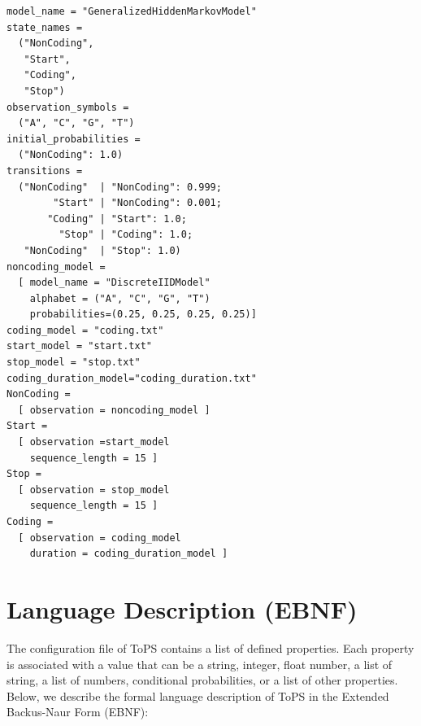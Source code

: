 \begin{Verbatim}[frame=single,  label={ghmm.txt}]
model_name = "GeneralizedHiddenMarkovModel"
state_names =
  ("NonCoding",
   "Start",
   "Coding",
   "Stop")
observation_symbols =
  ("A", "C", "G", "T")
initial_probabilities =
  ("NonCoding": 1.0)
transitions =
  ("NonCoding"  | "NonCoding": 0.999;
        "Start" | "NonCoding": 0.001;
       "Coding" | "Start": 1.0;
         "Stop" | "Coding": 1.0;
   "NonCoding"  | "Stop": 1.0)
noncoding_model =
  [ model_name = "DiscreteIIDModel"
    alphabet = ("A", "C", "G", "T")
    probabilities=(0.25, 0.25, 0.25, 0.25)]
coding_model = "coding.txt"
start_model = "start.txt"
stop_model = "stop.txt"
coding_duration_model="coding_duration.txt"
NonCoding =
  [ observation = noncoding_model ]
Start =
  [ observation =start_model
    sequence_length = 15 ]
Stop =
  [ observation = stop_model
    sequence_length = 15 ]
Coding =
  [ observation = coding_model
    duration = coding_duration_model ]
\end{Verbatim}


\section{Language Description (EBNF)}

The configuration file of ToPS contains a list of defined properties. Each property is associated with a value that can be a string, integer, float number, a list of string, a list of numbers, conditional probabilities, or a list of other properties.  Below, we describe the formal language description of ToPS in the Extended Backus-Naur Form (EBNF):

